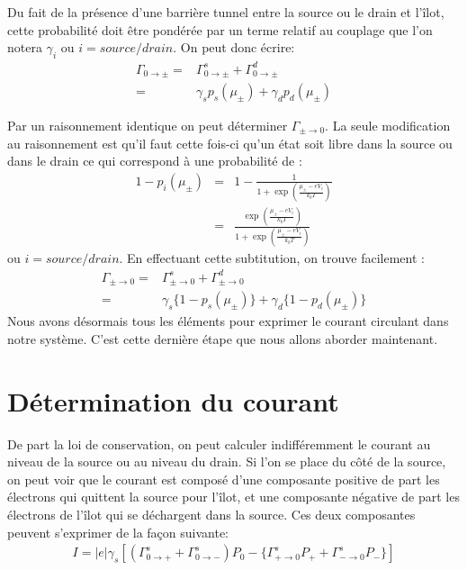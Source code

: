 Du fait de la présence d'une barrière tunnel entre la source ou le drain et l'\^ilot, cette probabilité doit être pondérée par un terme relatif au couplage que l'on notera $\gamma_i$ ou $i=source/drain$.
On peut donc écrire:
\begin{eqnarray}
\Gamma_{0 \rightarrow \pm} =& \Gamma_{0 \rightarrow \pm}^s + \Gamma_{0 \rightarrow \pm}^d  \nonumber \\
 =& \gamma_s p_s(\mu_\pm) + \gamma_d p_d(\mu_\pm)
\end{eqnarray}

Par un raisonnement identique on peut déterminer $\Gamma_{\pm \rightarrow 0}$. La seule modification au raisonnement est qu'il faut cette fois-ci qu'un état soit libre dans la source ou dans le drain ce qui correspond à une probabilité de :
\begin{eqnarray}
1 - p_i(\mu_\pm) &=& 1 - \frac{1}{1 + \exp{(\frac{\mu_\pm - eV_i}{k_bT})}} \nonumber \\
 &=& \frac{\exp{(\frac{\mu_\pm - eV_i}{k_bT})}}{1 + \exp{(\frac{\mu_\pm - eV_i}{k_bT})}}
\end{eqnarray}
ou $i=source/drain$.
En effectuant cette subtitution, on trouve facilement :
\begin{eqnarray}
\Gamma_{\pm \rightarrow 0} =& \Gamma_{\pm \rightarrow 0}^s + \Gamma_{\pm \rightarrow 0}^d  \nonumber \\
 =& \gamma_s \{1 - p_s(\mu_\pm)\} + \gamma_d \{1-p_d(\mu_\pm)\}
\end{eqnarray}
Nous avons désormais tous les éléments pour exprimer le courant circulant dans notre système. C'est cette dernière étape que nous allons aborder maintenant.
\section{Détermination du courant}
De part la loi de conservation, on peut calculer indifféremment le courant au niveau de la source ou au niveau du drain. Si l'on se place du c\^oté de la source, on peut voir que le courant est composé d'une composante positive de part les électrons qui quittent la source pour l'\^ilot, et une composante négative  de part les électrons de l'\^ilot qui se déchargent dans la source. Ces deux composantes peuvent s'exprimer de la façon suivante:
\begin{eqnarray}
I = |e| \gamma_s [(\Gamma_{0 \rightarrow +}^s + \Gamma_{0 \rightarrow -}^s) P_0 - \{ \Gamma_{+ \rightarrow 0}^s P_{+} + \Gamma_{- \rightarrow 0}^s P_{-}  \}]
\end{eqnarray}


